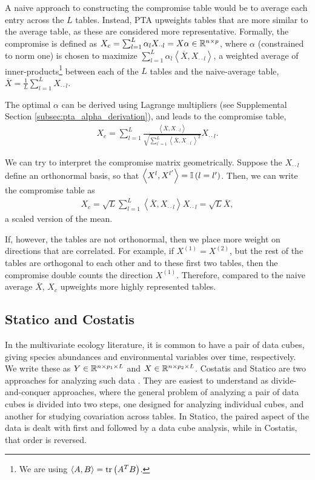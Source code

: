 \documentclass[14pt]{extarticle}
\begin{document}
A naive approach to constructing the compromise table would be to average each
entry across the $L$ tables. Instead, PTA upweights tables that are more similar
to the average table, as these are considered more representative. Formally, the
compromise is defined as $X_c = \sum_{l = 1}^{L}\alpha_{l} X_{\cdot\cdot l}
= X\alpha \in \mathbb{R}^{n \times p}$, where $\alpha$ (constrained to norm one) is
chosen to maximize $\sum_{l = 1}^{L} \alpha_{l} \left<\overline{X},
X_{\cdot\cdot l}\right>$, a weighted average of inner-products\footnote{We are
  using $\left<A, B\right> = \mathop\mathrm{tr}\left(A^{T}B\right)$.} between each of the $L$
tables and the naive-average table, $\overline{X} = \frac{1}{L}\sum_{l = 1}^{L}
X_{\cdot\cdot l}$.

The optimal $\alpha$ can be derived using Lagrange multipliers (see Supplemental
Section \ref{subsec:pta_alpha_derivation}), and leads to the compromise table,
\begin{align*}
  X_{c} = \sum_{l = 1}^{L} \frac{\left<\overline{X}, X_{\cdot\cdot l}\right>}{\sqrt{\sum_{l^{\prime}
      =1}^{L}\left<\overline{X},
      X_{\cdot\cdot l^{\prime}}\right>^{2}}} X_{\cdot\cdot l}.
\end{align*}

We can try to interpret the compromise matrix geometrically. Suppose
the $X_{\cdot\cdot l}$ define an orthonormal basis, so that $\left<X^{l},
  X^{l^{\prime}}\right> = \mathbb{I}\left({l = l^{\prime}}\right)$. Then, we can write
the compromise table as
\begin{align*}
  X_{c} = \sqrt{L}\sum_{l = 1}^{L}\left<\overline{X},
    X_{\cdot\cdot l}\right>X_{\cdot\cdot l} = \sqrt{L}\overline{X},
\end{align*}
a scaled version of the mean.

If, however, the tables are not orthonormal, then we place more weight on
directions that are correlated. For example, if $X^{(1)} = X^{(2)}$, but the
rest of the tables are orthogonal to each other and to these first two tables,
then the compromise double counts the direction $X^{(1)}$. Therefore, compared
to the naive average $\overline{X}$, $X_c$ upweights more highly represented
tables.

\subsection{Statico and Costatis}
\label{subsec:statico_and_costatis}

In the multivariate ecology literature, it is common to have a pair of data
cubes, giving species abundances and environmental variables over time,
respectively. We write these as $Y \in \mathbb{R}^{n \times p_{1} \times L}$ and $X
\in \mathbb{R}^{n \times p_{2} \times L}$. Costatis and Statico are two approaches
for analyzing such data \cite{thioulouse2011simultaneous}. They are easiest to
understand as divide-and-conquer approaches, where the general problem of
analyzing a pair of data cubes is divided into two steps, one designed for analyzing
individual cubes, and another for studying covariation across tables. In Statico, the paired
aspect of the data is dealt with first and followed by a data cube analysis,
while in Costatis, that order is reversed.
\end{document}
